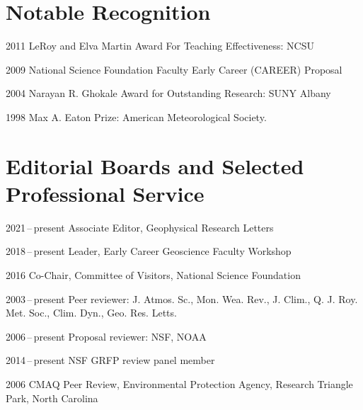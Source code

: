
\section*{Notable Recognition}

\begin{tlist}

\item[2011] LeRoy and Elva Martin Award For Teaching Effectiveness: NCSU
\item[2009] National Science Foundation Faculty Early Career (CAREER) Proposal
\item[2004] Narayan R. Ghokale Award for Outstanding Research: SUNY Albany
\item[1998] Max A. Eaton Prize: American Meteorological Society.

\end{tlist}



\section*{Editorial Boards and Selected Professional Service}

\begin{tlist}
\item[2021\,--\,present] Associate Editor, Geophysical Research Letters 
\item[2018\,--\,present] Leader, Early Career Geoscience Faculty Workshop 
\item[2016] Co-Chair, Committee of Visitors, National Science Foundation
\item[2003\,--\,present] Peer reviewer: J. Atmos. Sc., Mon. Wea. Rev., J. Clim., Q. J. Roy. Met. Soc., Clim. Dyn., Geo. Res. Letts.
\item[2006\,--\,present] Proposal reviewer: NSF, NOAA
\item[2014\,--\,present] NSF GRFP review panel member
\item[2006] CMAQ Peer Review, Environmental Protection Agency, Research Triangle Park, North Carolina
\end{tlist}


